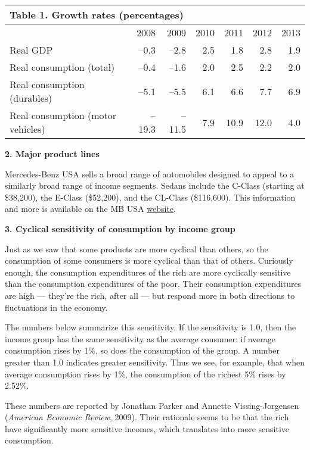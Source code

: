 \documentclass[letterpaper,12pt]{article}
\begin{document}
\begin{center}
\begin{tabular}{lrrrrrr}
\multicolumn{6}{l}{Table 1.  Growth rates (percentages)} \\
\toprule
        & 2008 & 2009 & 2010 & 2011 & 2012 & 2013 \\

\midrule
Real GDP
        & --0.3 & --2.8 & 2.5 & 1.8 & 2.8 & 1.9\\
Real consumption (total)
        & --0.4 & --1.6 & 2.0 & 2.5 & 2.2 & 2.0 \\
Real consumption (durables)
        & --5.1 & --5.5 & 6.1 & 6.6 & 7.7 & 6.9 \\
Real consumption (motor vehicles)
        & --19.3 & --11.5& 7.9 & 10.9 & 12.0 & 4.0 \\
\bottomrule
\end{tabular}
\end{center}

{\bf 2. Major product lines\/}

Mercedes-Benz USA sells a broad range of automobiles
designed to appeal to a similarly broad range of income segments.
Sedans include the C-Class (starting at \$38,200),
the E-Class (\$52,200), and the CL-Class (\$116,600).
This information and more is available on the
MB USA
\href{http://www.mbusa.com/}{website}.

{\bf 3. Cyclical sensitivity of consumption by income group\/}

Just as we saw that some products are more cyclical than others,
so the consumption of some consumers is more cyclical than that of others.
Curiously enough, the consumption expenditures of the rich are more
cyclically sensitive than the consumption expenditures of the poor.
Their consumption expenditures are high --- they're the rich, after all ---
but respond more
in both directions to fluctuations in the economy.

The numbers below summarize this sensitivity.
If the sensitivity is 1.0, then the income group has the same sensitivity
as the average consumer:
if average consumption rises by 1\%, so does the consumption of the group.
A number greater than 1.0 indicates greater sensitivity.
Thus we see, for example, that when average consumption
rises by 1\%,
the consumption of the richest 5\%  rises by 2.52\%.

These numbers are reported by Jonathan Parker and Annette Vissing-Jorgensen
({\it American Economic Review\/}, 2009).
Their rationale seems to be that the rich have significantly more
sensitive incomes, which translates into more sensitive consumption.
\end{document}
